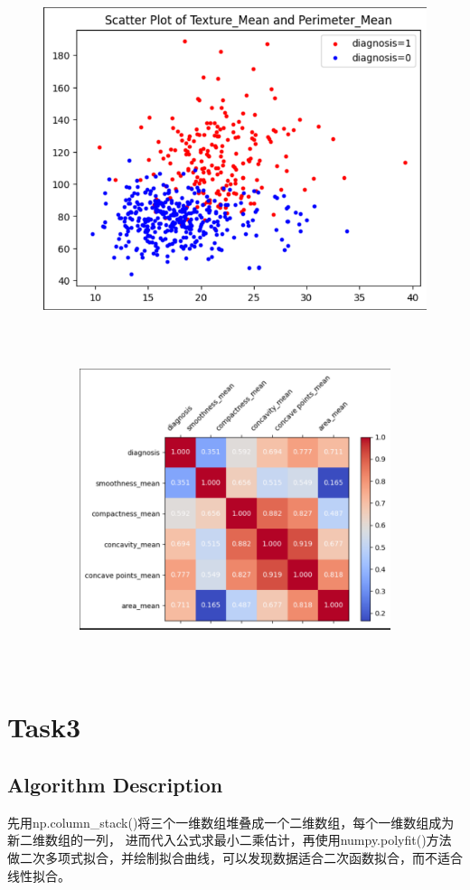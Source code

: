 \documentclass{ctexart}
\begin{document}
	\begin{figure}[H]
		\centering 
		\includegraphics[height=9cm,width=14cm]{4.png}
		\begin{figure}[H]
			\centering 
			\includegraphics[height=10cm,width=14cm]{5.png}
			\end{figure}
		\end{figure}
    \section{Task3}
    \subsection{Algorithm Description}
	先用np.column\_stack()将三个一维数组堆叠成一个二维数组，每个一维数组成为新二维数组的一列，
	进而代入公式求最小二乘估计，再使用numpy.polyfit()方法做二次多项式拟合，并绘制拟合曲线，可以发现数据适合二次函数拟合，而不适合线性拟合。
\end{document}
